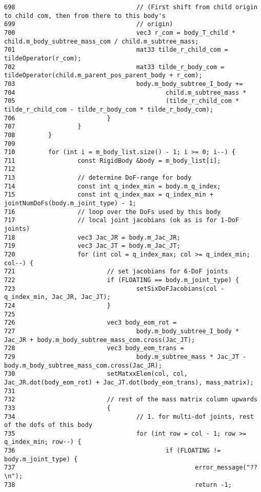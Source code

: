 \begin{Code}
\begin{verbatim}
698                                 // (First shift from child origin to child com, then from there to this body's
699                                 // origin)
700                                 vec3 r_com = body_T_child * child.m_body_subtree_mass_com / child.m_subtree_mass;
701                                 mat33 tilde_r_child_com = tildeOperator(r_com);
702                                 mat33 tilde_r_body_com = tildeOperator(child.m_parent_pos_parent_body + r_com);
703                                 body.m_body_subtree_I_body +=
704                                         child.m_subtree_mass *
705                                         (tilde_r_child_com * tilde_r_child_com - tilde_r_body_com * tilde_r_body_com);
706                         }
707                 }
708         }
709 
710         for (int i = m_body_list.size() - 1; i >= 0; i--) {
711                 const RigidBody &body = m_body_list[i];
712 
713                 // determine DoF-range for body
714                 const int q_index_min = body.m_q_index;
715                 const int q_index_max = q_index_min + jointNumDoFs(body.m_joint_type) - 1;
716                 // loop over the DoFs used by this body
717                 // local joint jacobians (ok as is for 1-DoF joints)
718                 vec3 Jac_JR = body.m_Jac_JR;
719                 vec3 Jac_JT = body.m_Jac_JT;
720                 for (int col = q_index_max; col >= q_index_min; col--) {
721                         // set jacobians for 6-DoF joints
722                         if (FLOATING == body.m_joint_type) {
723                                 setSixDoFJacobians(col - q_index_min, Jac_JR, Jac_JT);
724                         }
725 
726                         vec3 body_eom_rot =
727                                 body.m_body_subtree_I_body * Jac_JR + body.m_body_subtree_mass_com.cross(Jac_JT);
728                         vec3 body_eom_trans =
729                                 body.m_subtree_mass * Jac_JT - body.m_body_subtree_mass_com.cross(Jac_JR);
730                         setMatxxElem(col, col, Jac_JR.dot(body_eom_rot) + Jac_JT.dot(body_eom_trans), mass_matrix);
731 
732                         // rest of the mass matrix column upwards
733                         {
734                                 // 1. for multi-dof joints, rest of the dofs of this body
735                                 for (int row = col - 1; row >= q_index_min; row--) {
736                                         if (FLOATING != body.m_joint_type) {
737                                                 error_message("??\n");
738                                                 return -1;

\end{verbatim}
\end{Code}
